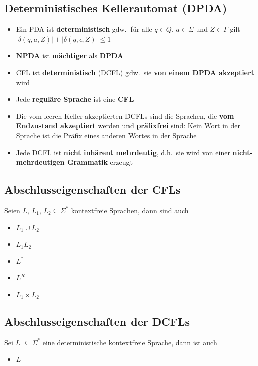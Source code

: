\documentclass[ieeetran]{article}
\begin{document}
\subsection{Deterministisches Kellerautomat (DPDA)} %
\label{sub:deterministisches_kellerautomat_dPDA_}
\begin{itemize}
  \item Ein PDA ist \textbf{deterministisch} gdw.\ für alle $q \in Q$, $a \in \Sigma$ und $Z \in \Gamma$ gilt $|\delta(q,a,Z)| + |\delta(q, \epsilon, Z)| \le 1$
\item \textbf{NPDA} ist \textbf{mächtiger} als \textbf{DPDA}
\item CFL ist \textbf{deterministisch} (DCFL) gdw.\ sie \textbf{von einem DPDA akzeptiert} wird
\item Jede \textbf{reguläre Sprache} ist eine \textbf{CFL}

\item Die vom leeren Keller akzeptierten DCFLs sind die Sprachen, die \textbf{vom Endzustand akzeptiert} werden und \textbf{präfixfrei} sind: Kein Wort in der Sprache ist die Präfix eines anderen Wortes in der Sprache

\item Jede DCFL ist \textbf{nicht inhärent mehrdeutig}, d.h.\ sie wird von einer \textbf{nicht-mehrdeutigen Grammatik} erzeugt

\end{itemize}

\subsection{Abschlusseigenschaften der CFLs} %
\label{sub:abschlusseigenschaften_der_cFLs}
Seien $L$, $L_1$, $L_2 \subseteq \Sigma^*$ kontextfreie Sprachen, dann sind auch
\begin{itemize}
  \item $L_1 \cup L_2$
\item $L_1L_2$
\item $L^*$
\item $L^R$
\item $L_1 \times L_2$
\end{itemize}


\subsection{Abschlusseigenschaften der DCFLs} %
\label{sub:abschlusseigenschaften_der_DCFLs}
Sei $L$ $\subseteq \Sigma^*$ eine deterministische kontextfreie Sprache, dann ist auch
\begin{itemize}
	\item $\overline{L}$
\end{itemize}
\end{document}
